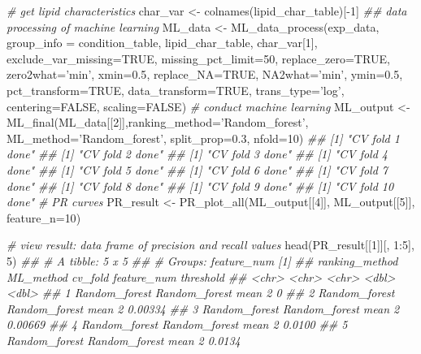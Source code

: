 \documentclass[]{article}
\newcommand{\hlnum}[1]{\textcolor[rgb]{0.816,0.125,0.439}{#1}}%
\newcommand{\hlstr}[1]{\textcolor[rgb]{0.251,0.627,0.251}{#1}}%
\newcommand{\hlcom}[1]{\textcolor[rgb]{0.502,0.502,0.502}{\textit{#1}}}%
\newcommand{\hlopt}[1]{\textcolor[rgb]{0,0,0}{#1}}%
\newcommand{\hlstd}[1]{\textcolor[rgb]{0.251,0.251,0.251}{#1}}%
\newcommand{\hlkwc}[1]{\textcolor[rgb]{0.251,0.251,0.251}{#1}}%
\newcommand{\hlkwd}[1]{\textcolor[rgb]{0.878,0.439,0.125}{#1}}%
\newenvironment{Shaded}{\begin{myshaded}}{\end{myshaded}}
\newcommand{\KeywordTok}[1]{\hlkwd{#1}}
\newcommand{\DataTypeTok}[1]{\hlkwc{#1}}
\newcommand{\DecValTok}[1]{\hlnum{#1}}
\newcommand{\FloatTok}[1]{\hlnum{#1}}
\newcommand{\StringTok}[1]{\hlstr{#1}}
\newcommand{\CommentTok}[1]{\hlcom{#1}}
\newcommand{\OtherTok}[1]{{#1}}
\newcommand{\OperatorTok}[1]{\hlopt{#1}}
\newcommand{\NormalTok}[1]{\hlstd{#1}}
\begin{document}
\begin{Shaded}
\begin{Highlighting}[]
\CommentTok{# get lipid characteristics}
\NormalTok{char_var <-}\StringTok{ }\KeywordTok{colnames}\NormalTok{(lipid_char_table)[}\OperatorTok{-}\DecValTok{1}\NormalTok{]}
\CommentTok{## data processing of machine learning}
\NormalTok{ML_data <-}\StringTok{ }\KeywordTok{ML_data_process}\NormalTok{(exp_data, }\DataTypeTok{group_info =}\NormalTok{ condition_table,}
\NormalTok{                           lipid_char_table, char_var[}\DecValTok{1}\NormalTok{],}
                           \DataTypeTok{exclude_var_missing=}\OtherTok{TRUE}\NormalTok{, }\DataTypeTok{missing_pct_limit=}\DecValTok{50}\NormalTok{,}
                           \DataTypeTok{replace_zero=}\OtherTok{TRUE}\NormalTok{, }\DataTypeTok{zero2what=}\StringTok{'min'}\NormalTok{, }\DataTypeTok{xmin=}\FloatTok{0.5}\NormalTok{,}
                           \DataTypeTok{replace_NA=}\OtherTok{TRUE}\NormalTok{, }\DataTypeTok{NA2what=}\StringTok{'min'}\NormalTok{, }\DataTypeTok{ymin=}\FloatTok{0.5}\NormalTok{,}
                           \DataTypeTok{pct_transform=}\OtherTok{TRUE}\NormalTok{, }\DataTypeTok{data_transform=}\OtherTok{TRUE}\NormalTok{,}
                           \DataTypeTok{trans_type=}\StringTok{'log'}\NormalTok{, }\DataTypeTok{centering=}\OtherTok{FALSE}\NormalTok{, }\DataTypeTok{scaling=}\OtherTok{FALSE}\NormalTok{)}
\CommentTok{# conduct machine learning}
\NormalTok{ML_output <-}\StringTok{ }\KeywordTok{ML_final}\NormalTok{(ML_data[[}\DecValTok{2}\NormalTok{]],}\DataTypeTok{ranking_method=}\StringTok{'Random_forest'}\NormalTok{,}
                      \DataTypeTok{ML_method=}\StringTok{'Random_forest'}\NormalTok{, }\DataTypeTok{split_prop=}\FloatTok{0.3}\NormalTok{, }\DataTypeTok{nfold=}\DecValTok{10}\NormalTok{)}
\CommentTok{## [1] "CV fold 1 done"}
\CommentTok{## [1] "CV fold 2 done"}
\CommentTok{## [1] "CV fold 3 done"}
\CommentTok{## [1] "CV fold 4 done"}
\CommentTok{## [1] "CV fold 5 done"}
\CommentTok{## [1] "CV fold 6 done"}
\CommentTok{## [1] "CV fold 7 done"}
\CommentTok{## [1] "CV fold 8 done"}
\CommentTok{## [1] "CV fold 9 done"}
\CommentTok{## [1] "CV fold 10 done"}
\CommentTok{# PR curves}
\NormalTok{PR_result <-}\StringTok{ }\KeywordTok{PR_plot_all}\NormalTok{(ML_output[[}\DecValTok{4}\NormalTok{]], ML_output[[}\DecValTok{5}\NormalTok{]], }\DataTypeTok{feature_n=}\DecValTok{10}\NormalTok{)}

\CommentTok{# view result: data frame of precision and recall values}
\KeywordTok{head}\NormalTok{(PR_result[[}\DecValTok{1}\NormalTok{]][, }\DecValTok{1}\OperatorTok{:}\DecValTok{5}\NormalTok{], }\DecValTok{5}\NormalTok{)}
\CommentTok{## # A tibble: 5 x 5}
\CommentTok{## # Groups:   feature_num [1]}
\CommentTok{##   ranking_method ML_method     cv_fold feature_num threshold}
\CommentTok{##   <chr>          <chr>         <chr>         <dbl>     <dbl>}
\CommentTok{## 1 Random_forest  Random_forest mean              2   0      }
\CommentTok{## 2 Random_forest  Random_forest mean              2   0.00334}
\CommentTok{## 3 Random_forest  Random_forest mean              2   0.00669}
\CommentTok{## 4 Random_forest  Random_forest mean              2   0.0100 }
\CommentTok{## 5 Random_forest  Random_forest mean              2   0.0134}


\end{Highlighting}
\end{Shaded}
\end{document}
